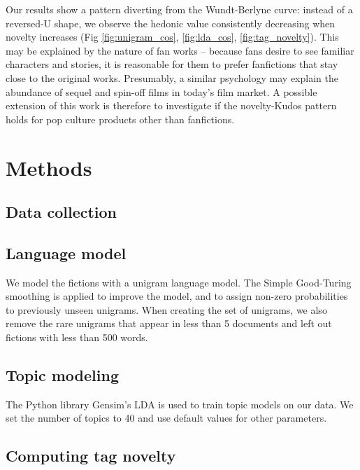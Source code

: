 \documentclass[a4paper]{article}
\begin{document}
Our results show a pattern diverting from the Wundt-Berlyne curve: instead of a reversed-U shape, we observe the hedonic value consistently decreasing when novelty increases (Fig \ref{fig:unigram_cos}, \ref{fig:lda_cos}, \ref{fig:tag_novelty}). This may be explained by the nature of fan works -- because fans desire to see familiar characters and stories, it is reasonable for them to prefer fanfictions that stay close to the original works. Presumably, a similar psychology may explain the abundance of sequel and spin-off films in today's film market. A possible extension of this work is therefore to investigate if the novelty-Kudos pattern holds for pop culture products other than fanfictions. 


\section*{Methods}

\subsection*{Data collection}






\subsection*{Language model}
We model the fictions with a unigram language model. The Simple Good-Turing smoothing\cite{gales1995good} is applied to improve the model, and to assign non-zero probabilities to previously unseen unigrams. When creating the set of unigrams, we also remove the rare unigrams that appear in less than 5 documents and left out fictions with less than 500 words.


\subsection*{Topic modeling}
The Python library Gensim's LDA \cite{gensimlda} is used to train topic models on our data. We set the number of topics to 40 and use default values for other parameters. 
\subsection*{Computing tag novelty}






    
\end{document}
